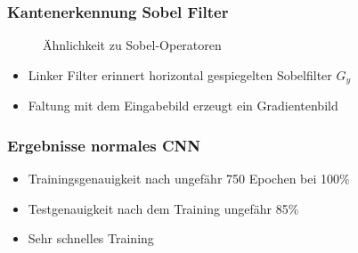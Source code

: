 \documentclass{beamer}
\begin{document}
\begin{frame}
	\frametitle{Kantenerkennung Sobel Filter}
	\begin{figure}
		\centering
		\caption{Ähnlichkeit zu Sobel-Operatoren}
		\label{fig:sobel}
	\end{figure}
	\begin{itemize}
		\item Linker Filter erinnert horizontal gespiegelten Sobelfilter $G_y$  
		\item Faltung mit dem Eingabebild erzeugt ein Gradientenbild
	\end{itemize}
\end{frame}

\begin{frame}
	\frametitle{Ergebnisse normales CNN}
	\begin{figure}
		\label{fig:conv_results}
	\end{figure}
	\begin{itemize}
		\item Trainingsgenauigkeit nach ungefähr 750 Epochen bei 100\%
		\item Testgenauigkeit nach dem Training ungefähr 85\%
		\item Sehr schnelles Training
	\end{itemize}
\end{frame}
\end{document}
